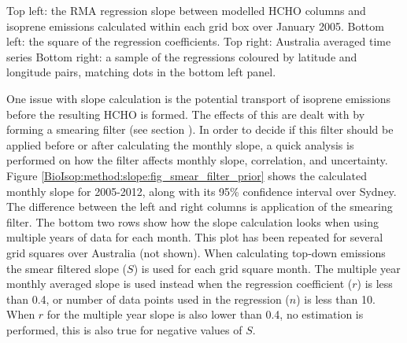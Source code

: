     
    { %
      Top left: the RMA regression slope between modelled HCHO columns and isoprene emissions calculated within each grid box over January 2005.
      Bottom left: the square of the regression coefficients.
      Top right: Australia averaged time series 
      Bottom right: a sample of the regressions coloured by latitude and longitude pairs, matching dots in the bottom left panel.
    }
    {\label{BioIsop:method:slope:fig_regressions}}
    
    One issue with slope calculation is the potential transport of isoprene emissions before the resulting HCHO is formed.
    The effects of this are dealt with by forming a smearing filter (see section ).
    In order to decide if this filter should be applied before or after calculating the monthly slope, a quick analysis is performed on how the filter affects monthly slope, correlation, and uncertainty.
    Figure \ref{BioIsop:method:slope:fig_smear_filter_prior} shows the calculated monthly slope for 2005-2012, along with its 95\% confidence interval over Sydney.
    The difference between the left and right columns is application of the smearing filter.
    The bottom two rows show how the slope calculation looks when using multiple years of data for each month.
    This plot has been repeated for several grid squares over Australia (not shown).
    When calculating top-down emissions the smear filtered slope ($S$) is used for each grid square month.
    The multiple year monthly averaged slope is used instead when the regression coefficient ($r$) is less than 0.4, or number of data points used in the regression ($n$) is less than 10.
    When $r$ for the multiple year slope is also lower than 0.4, no estimation is performed, this is also true for negative values of $S$.
    
    
